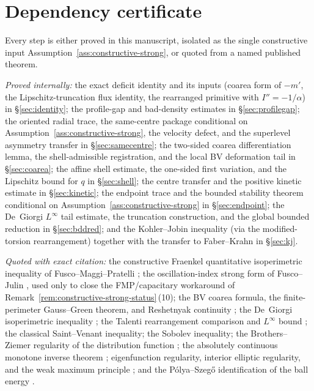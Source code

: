 \documentclass[11pt]{amsart}
\theoremstyle{definition}
\begin{document}
\section{Dependency certificate}\label{app:constants}

Every step is either proved in this manuscript, isolated as the single
constructive input Assumption~\ref{ass:constructive-strong}, or quoted from a
named published theorem.

\emph{Proved internally:} the exact deficit identity and its inputs (coarea
form of \(-m'\), the Lipschitz-truncation flux identity, the rearranged
primitive with \(I''=-1/\alpha\)) in \S\ref{sec:identity}; the profile-gap and
bad-density estimates in \S\ref{sec:profilegap}; the
oriented radial trace, the same-centre package conditional on
Assumption~\ref{ass:constructive-strong}, the velocity defect, and the
superlevel asymmetry transfer in \S\ref{sec:samecentre}; the two-sided coarea
differentiation lemma, the shell-admissible registration, and the local BV
deformation tail in \S\ref{sec:coarea}; the affine shell estimate, the
one-sided first variation, and the Lipschitz bound for \(q\) in
\S\ref{sec:shell}; the centre transfer and the positive kinetic estimate in
\S\ref{sec:kinetic}; the endpoint trace and the bounded stability theorem conditional on
Assumption~\ref{ass:constructive-strong} in
\S\ref{sec:endpoint}; the De~Giorgi \(L^\infty\) tail estimate, the truncation
construction, and the global bounded reduction in \S\ref{sec:bddred}; and the
Kohler--Jobin inequality (via the modified-torsion rearrangement) together with
the transfer to Faber--Krahn in \S\ref{sec:kj}.

\emph{Quoted with exact citation:} the constructive Fraenkel quantitative
isoperimetric inequality of Fusco--Maggi--Pratelli \cite{FMP}; the oscillation-index
strong form of Fusco--Julin \cite{FJ2014}, used only to close the FMP/capacitary
workaround of Remark~\ref{rem:constructive-strong-status}\,(10); the BV coarea
formula, the finite-perimeter Gauss--Green theorem, and Reshetnyak continuity
\cite{AFP2000,Maggi2012}; the De~Giorgi isoperimetric inequality
\cite{DeGiorgi1958}; the Talenti rearrangement comparison and \(L^\infty\) bound
\cite{Talenti1976}; the classical Saint--Venant inequality; the
Sobolev inequality; the Brothers--Ziemer regularity of the distribution
function \cite{AFP2000}; the absolutely continuous monotone inverse theorem
\cite{BBC1975}; eigenfunction regularity, interior elliptic regularity, and the
weak maximum principle \cite{GilbargTrudinger2001}; and the P\'olya--Szeg\H{o}
identification of the ball energy \cite{PolyaSzego1951,Bandle1980}.
\end{document}

